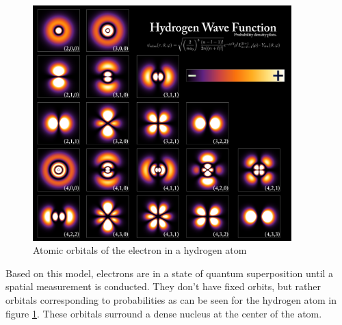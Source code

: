 \begin{figure}[H]
  \centering
  \includegraphics[width=100mm]{figures/electronCloud.png}
  \caption{Atomic orbitals of the electron in a hydrogen atom}
  \label{electronCloud}
\end{figure}

Based on this model, electrons are in a state of quantum superposition until a spatial measurement is conducted.
They don't have fixed orbits, but rather orbitals corresponding to probabilities as can be seen for the hydrogen atom in figure \ref{electronCloud}.
These orbitals surround a dense nucleus at the center of the atom.
